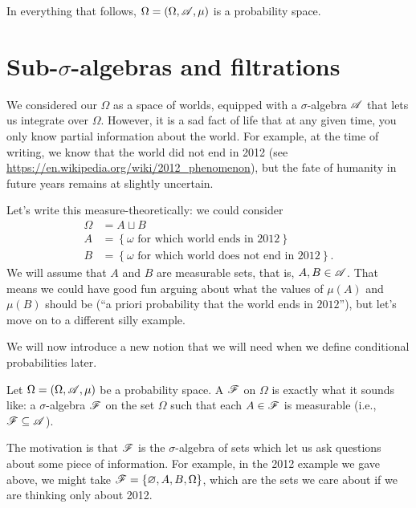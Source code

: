 In everything that follows, $\Omega = (\Omega, \mathscr A, \mu)$ is a probability space.

\section{Sub-$\sigma$-algebras and filtrations}
We considered our $\Omega$ as a space of worlds,
equipped with a $\sigma$-algebra $\mathscr A$ that lets us integrate over $\Omega$.
However, it is a sad fact of life that at any given time,
you only know partial information about the world.
For example, at the time of writing,
we know that the world did not end in 2012
(see \url{https://en.wikipedia.org/wiki/2012_phenomenon}),
but the fate of humanity in future years remains at slightly uncertain.

Let's write this measure-theoretically: we could consider
\begin{align*}
	\Omega &= A \sqcup B \\
	A &= \left\{ \omega \text{ for which world ends in $2012$} \right\} \\
	B &= \left\{ \omega \text{ for which world does not end in $2012$} \right\}.
\end{align*}
We will assume that $A$ and $B$ are measurable sets,
that is, $A,B \in \mathscr A$.
That means we could have good fun arguing about what the values
of $\mu(A)$ and $\mu(B)$ should be
(``a priori probability that the world ends in $2012$''),
but let's move on to a different silly example.


We will now introduce a new notion that
we will need when we define conditional probabilities later.
\begin{definition}
	Let $\Omega = (\Omega, \mathscr A, \mu)$ be a probability space.
	A  $\mathscr F$
	on $\Omega$ is exactly what it sounds like:
	a $\sigma$-algebra $\mathscr F$ on the set $\Omega$
	such that each $A \in \mathscr F$ is measurable
	(i.e.,\ $\mathscr F \subseteq \mathscr A$).
\end{definition}

The motivation is that $\mathscr F$ is the $\sigma$-algebra of sets
which let us ask questions about some piece of information.
For example, in the 2012 example we gave above,
we might take $\mathscr F = \{\varnothing, A, B, \Omega\}$,
which are the sets we care about if we are thinking only about 2012.

